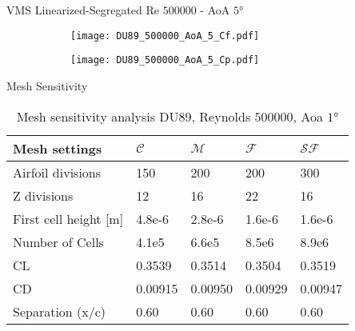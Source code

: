 \begin{frame}{VMS Linearized-Segregated}
Re $\num{500000}$ - AoA $\ang{5}$ 
\begin{figure}[h]
     \centering          
     \begin{subfigure}[h]{0.45\textwidth}
              \centering
         \texttt{[image: DU89\_500000\_AoA\_5\_Cf.pdf]}
    \end{subfigure}
          \hfill
     \begin{subfigure}[h]{0.45\textwidth}
      \centering
         \texttt{[image: DU89\_500000\_AoA\_5\_Cp.pdf]}
     \end{subfigure}
     \end{figure} 
 \end{frame}


\begin{frame}{Mesh Sensitivity}
\begin{table}[!ht]
     \centering
     \begin{tabular}{l|llll}
         \hline
         Mesh settings & $\mathcal{C}$ & $\mathcal{M}$ & $\mathcal{F}$ & $\mathcal{SF}$ \\  \hline
         Airfoil divisions & 150 & 200 & 200 & 300 \\ 
         Z divisions & 12 & 16 & 22 & 16 \\ 
         First cell height [m] & 4.8e-6 & 2.8e-6 & 1.6e-6 & 1.6e-6 \\ 
         Number of Cells & 4.1e5 & 6.6e5 & 8.5e6 & 8.9e6 \\ \hline
         CL & 0.3539 & 0.3514 & 0.3504 & 0.3519 \\
         CD & 0.00915 & 0.00950 & 0.00929 & 0.00947 \\ 
         Separation (x/c) & 0.60 & 0.60 & 0.60 & 0.60 \\ 
     \end{tabular}
 \caption{Mesh sensitivity analysis DU89, Reynolds $\num{500000}$, Aoa $\ang{1}$}
 \label{tab:mesh-sensitivity-re500000}
 \end{table}
\end{frame}


